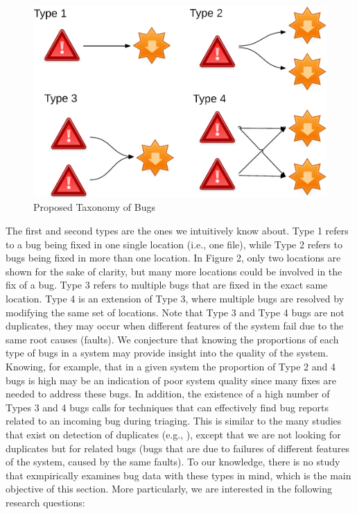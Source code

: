 \begin{figure}[h!]
  \centering
    \includegraphics[scale=0.8]{media/bug-taxo.png}
    \caption{Proposed Taxonomy of Bugs
    \label{fig:bug-taxo}}
\end{figure}


The first and second types are the ones we intuitively know
about. Type 1 refers to a bug being fixed in one single location
(i.e., one file), while Type 2 refers to bugs being fixed in more
than one location. In Figure 2, only two locations are shown
for the sake of clarity, but many more locations could be
involved in the fix of a bug. Type 3 refers to multiple bugs that
are fixed in the exact same location. Type 4 is an extension of
Type 3, where multiple bugs are resolved by modifying the
same set of locations. Note that Type 3 and Type 4 bugs are
not duplicates, they may occur when different features of the
system fail due to the same root causes (faults).
We conjecture that knowing the proportions of each type
of bugs in a system may provide insight into the quality of the
system. Knowing, for example, that in a given system the
proportion of Type 2 and 4 bugs is high may be an indication
of poor system quality since many fixes are needed to address
these bugs. In addition, the existence of a high number of
Types 3 and 4 bugs calls for techniques that can effectively
find bug reports related to an incoming bug during triaging.
This is similar to the many studies that exist on detection of
duplicates (e.g., \cite{Runeson2007,Sun2010,Nguyen2012}), except that we are not looking for
duplicates but for related bugs (bugs that are due to failures of
different features of the system, caused by the same faults). To
our knowledge, there is no study that exmpirically examines
bug data with these types in mind, which is the main objective
of this section. More particularly, we are interested in the
following research questions:

